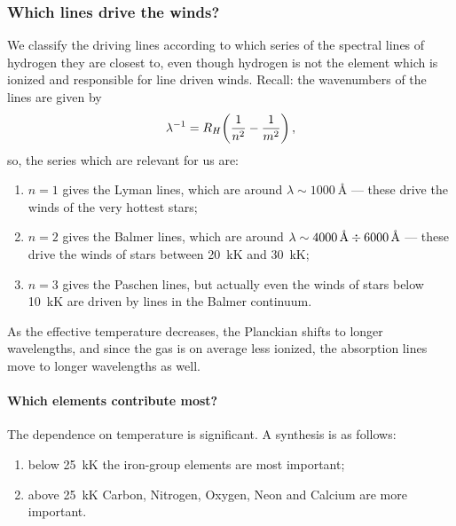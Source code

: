 \documentclass[main.tex]{subfiles}
\begin{document}

\subsubsection{Which lines drive the winds?}

We classify the driving lines according to which series of the spectral lines of hydrogen they are closest to, even though hydrogen is not the element which is ionized and responsible for line driven winds.
Recall: the wavenumbers of the lines are given by 
%
\begin{align}
\lambda^{-1} = R_H \qty(\frac{1}{n^2}- \frac{1}{m^2})
\,,
\end{align}
%
so, the series which are relevant for us are:
\begin{enumerate}
  \item \(n=1\) gives the Lyman lines, which are around \(\lambda \sim \SI{1000}{\angstrom}\) --- these drive the winds of the very hottest stars;
  \item \(n=2\) gives the Balmer lines, which are around \(\lambda \sim \SI{4000}{\angstrom} \divisionsymbol \SI{6000}{\angstrom}\) --- these drive the winds of stars between \SI{20}{\kilo\kelvin} and \SI{30}{\kilo\kelvin};
  \item \(n=3\) gives the Paschen lines, but actually even the winds of stars below \SI{10}{\kilo\kelvin} are driven by lines in the Balmer continuum.
\end{enumerate}

As the effective temperature decreases, the Planckian shifts to longer wavelengths, and since the gas is on average less ionized, the absorption lines move to longer wavelengths as well.

\paragraph{Which elements contribute most?}

The dependence on temperature is significant. A synthesis is as follows: 
\begin{enumerate}
  \item below \SI{25}{\kilo\kelvin} the iron-group elements are most important;
  \item above \SI{25}{\kilo\kelvin} Carbon, Nitrogen, Oxygen, Neon and Calcium are more important.
\end{enumerate}
\end{document}
